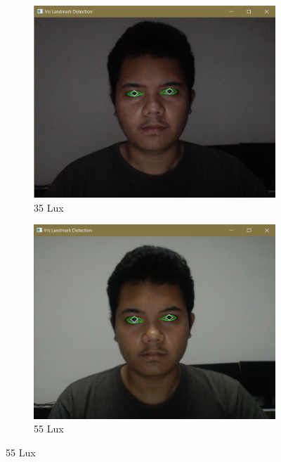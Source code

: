 \begin{figure}[H]
  \centering
  \begin{subfigure}[b]{0.4\linewidth}
      \includegraphics[width=\linewidth]{gambar/bab4/33.png}
      \caption{35 Lux}
      \label{fig:imagea}
  \end{subfigure}
  \hfill %
  \begin{subfigure}[b]{0.4\linewidth}
      \includegraphics[width=\linewidth]{gambar/bab4/55.png}
      \caption{55 Lux}
      \label{fig:imageb}
  \end{subfigure}
  \vspace{1cm} %

\end{figure}
